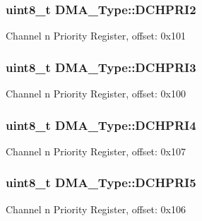 \subsubsection[{\texorpdfstring{D\+C\+H\+P\+R\+I2}{DCHPRI2}}]{ uint8\+\_\+t D\+M\+A\+\_\+\+Type\+::\+D\+C\+H\+P\+R\+I2}\hypertarget{structDMA__Type_a4abf6224f088c016546122a284327aa2}{}\label{structDMA__Type_a4abf6224f088c016546122a284327aa2}
Channel n Priority Register, offset\+: 0x101 
\subsubsection[{\texorpdfstring{D\+C\+H\+P\+R\+I3}{DCHPRI3}}]{ uint8\+\_\+t D\+M\+A\+\_\+\+Type\+::\+D\+C\+H\+P\+R\+I3}\hypertarget{structDMA__Type_ae58a58530d1661b300d5f238ca0a108c}{}\label{structDMA__Type_ae58a58530d1661b300d5f238ca0a108c}
Channel n Priority Register, offset\+: 0x100 
\subsubsection[{\texorpdfstring{D\+C\+H\+P\+R\+I4}{DCHPRI4}}]{ uint8\+\_\+t D\+M\+A\+\_\+\+Type\+::\+D\+C\+H\+P\+R\+I4}\hypertarget{structDMA__Type_ae89d8ee1fe06168e6a498d52135a0fee}{}\label{structDMA__Type_ae89d8ee1fe06168e6a498d52135a0fee}
Channel n Priority Register, offset\+: 0x107 
\subsubsection[{\texorpdfstring{D\+C\+H\+P\+R\+I5}{DCHPRI5}}]{ uint8\+\_\+t D\+M\+A\+\_\+\+Type\+::\+D\+C\+H\+P\+R\+I5}\hypertarget{structDMA__Type_a50f4f0c1434366f9378ab00ce2b4259f}{}\label{structDMA__Type_a50f4f0c1434366f9378ab00ce2b4259f}
Channel n Priority Register, offset\+: 0x106 
